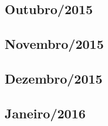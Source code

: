 \documentclass[12pt,a4paper]{article}
\begin{document}
%   
% 
\subsection{Outubro/2015}
  
   
%   

\subsection{Novembro/2015}
  
   
%   

\subsection{Dezembro/2015}
  
      
%   

\subsection{Janeiro/2016} 
  
      

\end{document}
